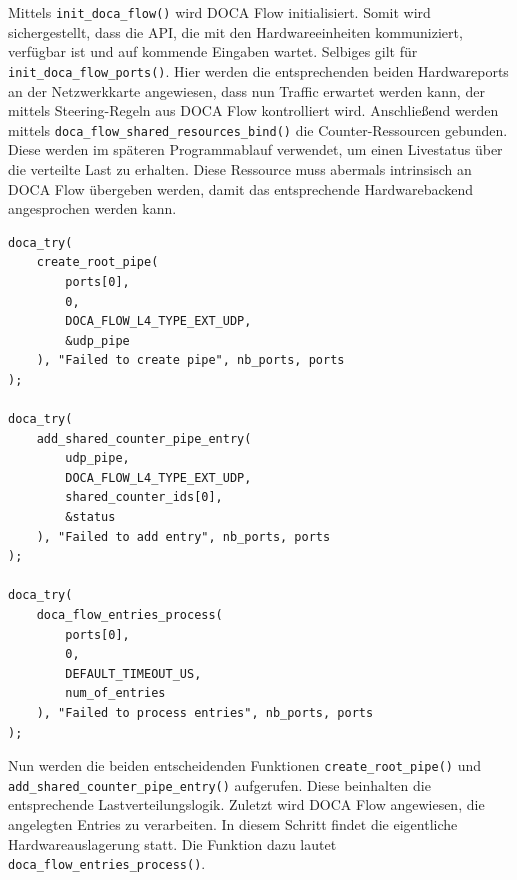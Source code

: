 Mittels \texttt{init\_doca\_flow()} wird DOCA Flow initialisiert. Somit wird sichergestellt, dass die API, die mit den Hardwareeinheiten kommuniziert, verfügbar ist und auf kommende Eingaben wartet. Selbiges gilt für \texttt{init\_doca\_flow\_ports()}. Hier werden die entsprechenden beiden Hardwareports an der Netzwerkkarte angewiesen, dass nun Traffic erwartet werden kann, der mittels Steering-Regeln aus DOCA Flow kontrolliert wird. Anschließend werden mittels \texttt{doca\_flow\_shared\_resources\_bind()} die Counter-Ressourcen gebunden. Diese werden im späteren Programmablauf verwendet, um einen Livestatus über die verteilte Last zu erhalten. Diese Ressource muss abermals intrinsisch an DOCA Flow übergeben werden, damit das entsprechende Hardwarebackend angesprochen werden kann.
\begin{verbatim} 
doca_try(
    create_root_pipe(
        ports[0], 
        0, 
        DOCA_FLOW_L4_TYPE_EXT_UDP, 
        &udp_pipe
    ), "Failed to create pipe", nb_ports, ports
);

doca_try(
    add_shared_counter_pipe_entry(
        udp_pipe, 
        DOCA_FLOW_L4_TYPE_EXT_UDP, 
        shared_counter_ids[0], 
        &status
    ), "Failed to add entry", nb_ports, ports
);

doca_try(
    doca_flow_entries_process(
        ports[0], 
        0, 
        DEFAULT_TIMEOUT_US, 
        num_of_entries
    ), "Failed to process entries", nb_ports, ports
);
\end{verbatim}
Nun werden die beiden entscheidenden Funktionen \texttt{create\_root\_pipe()} und \newline\texttt{add\_shared\_counter\_pipe\_entry()} aufgerufen. Diese beinhalten die entsprechende Lastverteilungslogik. Zuletzt wird DOCA Flow angewiesen, die angelegten Entries zu verarbeiten. In diesem Schritt findet die eigentliche Hardwareauslagerung statt. Die Funktion dazu lautet \texttt{doca\_flow\_entries\_process()}.
